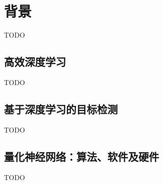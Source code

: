 \chapter{背景} \label{chap::background}
TODO

\section{高效深度学习}
TODO

\section{基于深度学习的目标检测}
TODO

\section{量化神经网络：算法、软件及硬件}
TODO
